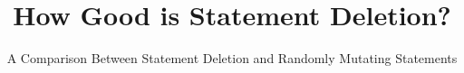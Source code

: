 \title{How Good is Statement Deletion?}
\subtitle{A Comparison Between Statement Deletion and Randomly Mutating Statements}
